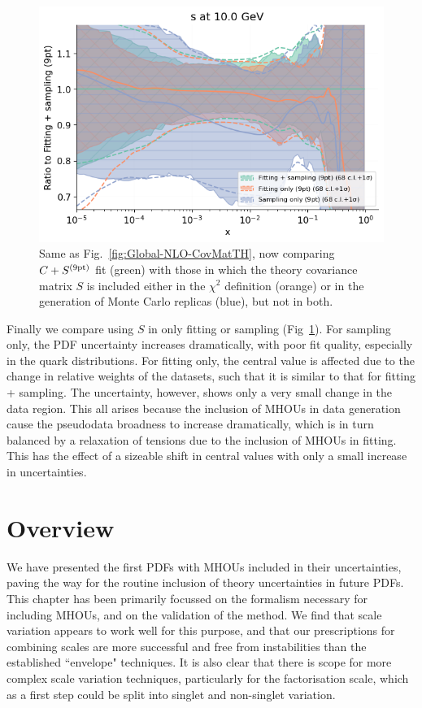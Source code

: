 \begin{figure}[h]
\begin{center}
       \includegraphics[scale=0.44]{mhous/plots/jplots/j3s.png}
   \caption{\small Same as Fig.~\ref{fig:Global-NLO-CovMatTH}, now comparing $C+S^{(\rm 9pt)}$ fit (green) with those in which
     the theory covariance matrix $S$ is included either in the $\chi^2$
     definition (orange) or in the generation of Monte Carlo replicas (blue), but not in both.
    \label{fig:Global-NLO-CovMatTH-tests} }
  \end{center}
\end{figure}
\newpage
Finally we compare using $S$ in only fitting or sampling (Fig~\ref{fig:Global-NLO-CovMatTH-tests}). For sampling only, the PDF uncertainty increases dramatically, with poor fit quality, especially in the quark distributions. For fitting only, the central value is affected due to the change in relative weights of the datasets, such that it is similar to that for fitting + sampling. The uncertainty, however, shows only a very small change in the data region. This all arises because the inclusion of MHOUs in data generation cause the pseudodata broadness to increase dramatically, which is in turn balanced by a relaxation of tensions due to the inclusion of MHOUs in fitting. This has the effect of a sizeable shift in central values with only a small increase in uncertainties. 

\section{Overview}
\label{sec:overview}
We have presented the first PDFs with MHOUs included in their uncertainties, paving the way for the routine inclusion of theory uncertainties in future PDFs. This chapter has been primarily focussed on the formalism necessary for including MHOUs, and on the validation of the method. We find that scale variation appears to work well for this purpose, and that our prescriptions for combining scales are more successful and free from instabilities than the established ``envelope" techniques. It is also clear that there is scope for more complex scale variation techniques, particularly for the factorisation scale, which as a first step could be split into singlet and non-singlet variation. 


